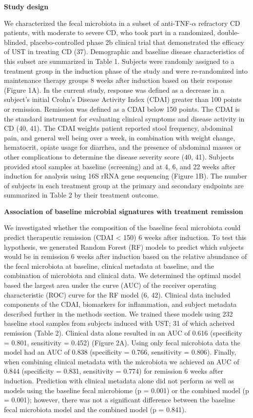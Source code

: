 \documentclass[12pt,]{article}
\begin{document}
\textbf{Study design}

We characterized the fecal microbiota in a subset of
anti-TNF-\({\alpha}\) refractory CD patients, with moderate to severe
CD, who took part in a randomized, double-blinded, placebo-controlled
phase 2b clinical trial that demonstrated the efficacy of UST in
treating CD (37). Demographic and baseline disease characteristics of
this subset are summarized in Table 1. Subjects were randomly assigned
to a treatment group in the induction phase of the study and were
re-randomized into maintenance therapy groups 8 weeks after induction
based on their response (Figure 1A). In the current study, response was
defined as a decrease in a subject's initial Crohn's Disease Activity
Index (CDAI) greater than 100 points or remission. Remission was defined
as a CDAI below 150 points. The CDAI is the standard instrument for
evaluating clinical symptoms and disease activity in CD (40, 41). The
CDAI weights patient reported stool frequency, abdominal pain, and
general well being over a week, in combination with weight change,
hematocrit, opiate usage for diarrhea, and the presence of abdominal
masses or other complications to determine the disease severity score
(40, 41). Subjects provided stool samples at baseline (screening) and at
4, 6, and 22 weeks after induction for analysis using 16S rRNA gene
sequencing (Figure 1B). The number of subjects in each treatment group
at the primary and secondary endpoints are summarized in Table 2 by
their treatment outcome.

\textbf{Association of baseline microbial signatures with treatment
remission}

We investigated whether the composition of the baseline fecal microbiota
could predict therapeutic remission (CDAI \textless{} 150) 6 weeks after
induction. To test this hypothesis, we generated Random Forest (RF)
models to predict which subjects would be in remission 6 weeks after
induction based on the relative abundance of the fecal microbiota at
baseline, clinical metadata at baseline, and the combination of
microbiota and clinical data. We determined the optimal model based the
largest area under the curve (AUC) of the receiver operating
characteristic (ROC) curve for the RF model (6, 42). Clinical data
included components of the CDAI, biomarkers for inflammation, and
subject metadata described further in the methods section. We trained
these models using 232 baseline stool samples from subjects induced with
UST; 31 of which acheived remission (Table 2). Clinical data alone
resulted in an AUC of 0.616 (specificity = 0.801, sensitivity = 0.452)
(Figure 2A). Using only fecal microbiota data the model had an AUC of
0.838 (specificity = 0.766, sensitivity = 0.806). Finally, when
combining clinical metadata with the microbiota we achieved an AUC of
0.844 (specificity = 0.831, sensitivity = 0.774) for remission 6 weeks
after induction. Prediction with clinical metadata alone did not perform
as well as models using the baseline fecal microbiome (p = 0.001) or the
combined model (p = 0.001); however, there was not a significant
difference between the baseline fecal microbiota model and the combined
model (p = 0.841).
\end{document}

